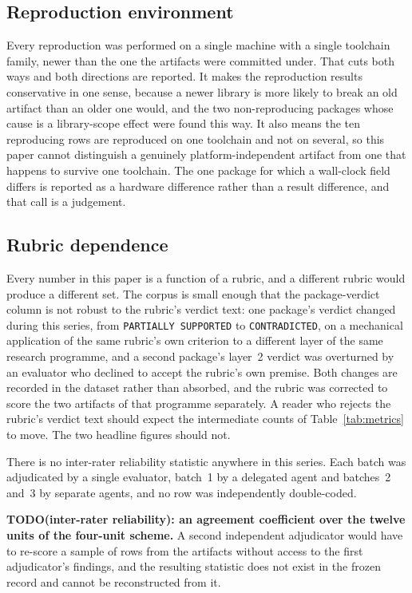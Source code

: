 \documentclass[sigconf,review]{acmart}
\begin{document}
\subsection{Reproduction environment}
\label{sec:threat-env}

Every reproduction was performed on a single machine with a single toolchain
family, newer than the one the artifacts were committed under. That cuts both
ways and both directions are reported. It makes the reproduction results
conservative in one sense, because a newer library is more likely to break an
old artifact than an older one would, and the two non-reproducing packages
whose cause is a library-scope effect were found this way. It also means the
ten reproducing rows are reproduced on one toolchain and not on several, so
this paper cannot distinguish a genuinely platform-independent artifact from
one that happens to survive one toolchain. The one package for which a
wall-clock field differs is reported as a hardware difference rather than a
result difference, and that call is a judgement.

\subsection{Rubric dependence}
\label{sec:threat-rubric}

Every number in this paper is a function of a rubric, and a different rubric
would produce a different set. The corpus is small enough that the
package-verdict column is not robust to the rubric's verdict text: one
package's verdict changed during this series, from \texttt{PARTIALLY
SUPPORTED} to \texttt{CONTRADICTED}, on a mechanical application of the same
rubric's own criterion to a different layer of the same research programme,
and a second package's layer~2 verdict was overturned by an evaluator who
declined to accept the rubric's own premise. Both changes are recorded in the
dataset rather than absorbed, and the rubric was corrected to score the two
artifacts of that programme separately. A reader who rejects the rubric's
verdict text should expect the intermediate counts of
Table~\ref{tab:metrics} to move. The two headline figures should not.

There is no inter-rater reliability statistic anywhere in this series. Each
batch was adjudicated by a single evaluator, batch~1 by a delegated agent and
batches~2 and~3 by separate agents, and no row was independently
double-coded.

\textbf{TODO(inter-rater reliability): an agreement coefficient over the
twelve units of the four-unit scheme.} A second independent adjudicator would
have to re-score a sample of rows from the artifacts without access to the
first adjudicator's findings, and the resulting statistic does not exist in
the frozen record and cannot be reconstructed from it.
\end{document}
